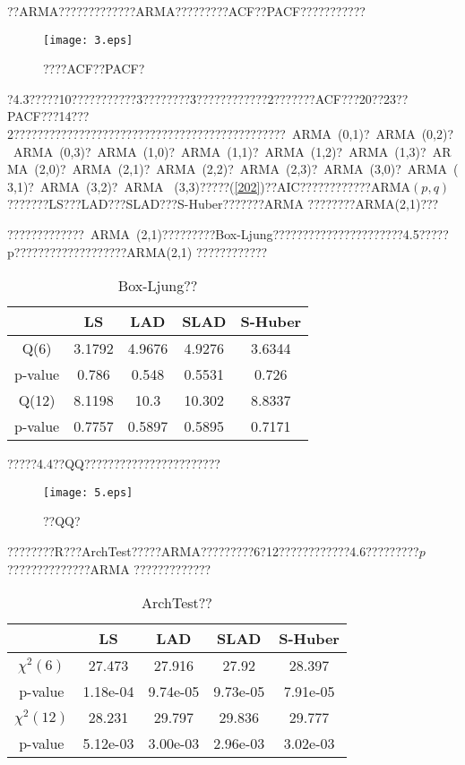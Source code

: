 \documentclass[a4paper,12pt,openany,oneside,utf-8]{ctexbook}
\begin{document}
	??ARMA?????????????ARMA?????????ACF??PACF???????????
	\begin{figure}[htb]
		\centering
		\texttt{[image: 3.eps]}
		\caption{????ACF??PACF?}
	\end{figure}
	
	?4.3?????10???????????3????????3????????????2???????ACF???20??23??PACF???14???2??????????????????????????????????????????????~ARMA~(0,1)?~ARMA~(0,2)?~ARMA~(0,3)?~ARMA~(1,0)?~ARMA~(1,1)?~ARMA~(1,2)?~ARMA~(1,3)?~ARMA~(2,0)?~ARMA~(2,1)?~ARMA~(2,2)?~ARMA~(2,3)?~ARMA~(3,0)?~ARMA~(3,1)?~ARMA~(3,2)?~ARMA~
	(3,3)?????(\ref{202})??AIC????????????ARMA$(p,q)$???????LS???LAD???SLAD???S-Huber???????ARMA ????????ARMA(2,1)???
	
	?????????????~ARMA~(2,1)?????????Box-Ljung??????????????????????4.5?????p???????????????????ARMA(2,1) ????????????
	\begin{center}
		\begin{table}[htbp]
			\begin{center}
				\caption{Box-Ljung??}
				\small{\begin{tabular}{ccccc}
						\hline    &   LS  &  LAD  & SLAD & S-Huber \\
						\hline Q(6) & 3.1792 & 4.9676 & 4.9276 & 3.6344 \\
						\hline p-value   & 0.786 & 0.548 & 0.5531 & 0.726   \\
						\hline Q(12) & 8.1198 & 10.3 & 10.302 & 8.8337 \\
						\hline p-value   & 0.7757 & 0.5897 & 0.5895 & 0.7171 \\
						\hline
				\end{tabular}}
				\label{tab:size}
			\end{center}
		\end{table}
	\end{center}
	
	?????4.4??QQ???????????????????????
	\newpage
	\begin{figure}[htb]
		\centering
		\texttt{[image: 5.eps]}
		\caption{??QQ?}
	\end{figure}
	
	????????R???ArchTest?????ARMA?????????6?12????????????4.6?????????$p$??????????????ARMA ?????????????
	\begin{center}
		\begin{table}[htb]
			\begin{center}
				\caption{ArchTest??}
				\small{\begin{tabular}{ccccc}
						\hline    &   LS  &  LAD  & SLAD & S-Huber \\
						\hline $\chi^2(6)$ & 27.473 & 27.916 & 27.92 & 28.397 \\
						\hline p-value   & 1.18e-04 & 9.74e-05 & 9.73e-05 & 7.91e-05 \\
						\hline $\chi^2(12)$ & 28.231 & 29.797 & 29.836 & 29.777 \\
						\hline p-value   & 5.12e-03 & 3.00e-03 & 2.96e-03 & 3.02e-03 \\
						\hline
				\end{tabular}}
				\label{tab:size}
			\end{center}
		\end{table}
	\end{center}
	
\end{document}
